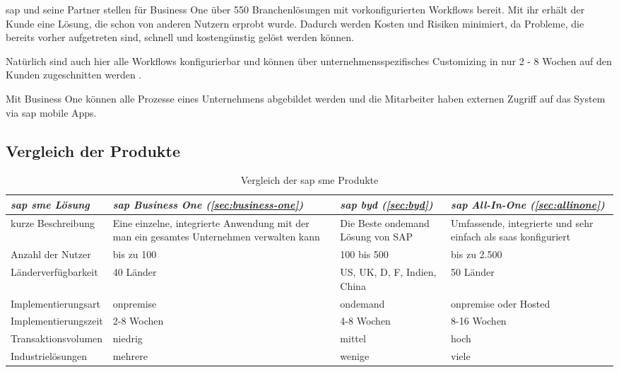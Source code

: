 \gls{sap} und seine Partner stellen für Business One über 550 Branchenlösungen mit vorkonfigurierten Workflows bereit. Mit ihr erhält der Kunde eine Lösung, die schon von anderen Nutzern erprobt wurde. Dadurch werden Kosten und Risiken minimiert, da Probleme, die bereits vorher aufgetreten sind, schnell und kostengünstig gelöst werden können.

Natürlich sind auch hier alle Workflows konfigurierbar und können über unternehmensspezifisches Customizing in nur 2 - 8 Wochen auf den Kunden zugeschnitten werden \cite{BusinessOne}.

Mit Business One können alle Prozesse eines Unternehmens abgebildet werden und die Mitarbeiter haben externen Zugriff auf das System via \gls{sap} mobile Apps.

\subsection{Vergleich der Produkte}
\begin{table}[H]
\begin{center}
\begin{tabular}{p{3.8cm}||p{3cm}|p{3cm}|p{3cm}}
  \emph{\gls{sap} \gls{sme} Lösung} & \emph{\gls{sap} Business One (\ref{sec:business-one})} & \emph{\gls{sap} \gls{byd} (\ref{sec:byd})} & \emph{\gls{sap} All-In-One (\ref{sec:allinone})}\\	
  \hline
  kurze Beschreibung & Eine einzelne, integrierte Anwendung mit der man ein gesamtes Unternehmen verwalten kann & Die Beste \gls{ondemand} Lösung von SAP & Umfassende, integrierte und sehr einfach als \gls{saas} konfiguriert\\
  \hline
  Anzahl der Nutzer & bis zu 100 & 100 bis 500 &  bis zu 2.500\\
  \hline
  Länderverfügbarkeit & 40 Länder & US, UK, D, F, Indien, China & 50 Länder\\
  \hline	
  Implementierungsart & \gls{onpremise} & \gls{ondemand} & \gls{onpremise} oder Hosted\\
  \hline	
  Implementierungszeit & 2-8 Wochen & 4-8 Wochen & 8-16 Wochen\\
  \hline	
  Transaktionsvolumen & niedrig & mittel & hoch\\
  \hline	
  Industrielösungen & mehrere & wenige & viele\\
  \hline				
\end{tabular}
\end{center}
\caption{Vergleich der \gls{sap} \gls{sme} Produkte} 
\label{tab:smevergleich}
\end{table}

